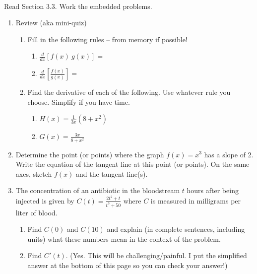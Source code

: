 \documentclass[11pt,fleqn]{article}
\begin{document}
\renewcommand{\headrulewidth}{0pt}
\newcommand{\blank}[1]{\rule{#1}{0.75pt}}
\newcommand{\bc}{\begin{center}}
\newcommand{\ec}{\end{center}}
\renewcommand{\d}{\displaystyle}

\vspace*{-0.7in}

\begin{center}
  \large
  \\
\end{center}
Read Section 3.3. Work the embedded problems. \\
\begin{enumerate}
\item Review (aka mini-quiz)\\
	\begin{enumerate}
	\item Fill in the following rules -- from memory if possible!\\
	\begin{multicols}{2}
	\begin{enumerate}
	\item $\displaystyle{\frac{d}{dx}\left[f(x)\: g(x)\right]=}$\\

	\item $\displaystyle{\frac{d}{dx}\left[\frac{f(x)}{g(x)}\right]=}$\\

	\end{enumerate}
	\end{multicols}
	
	\item Find the derivative of each of the following. Use whatever rule you choose. Simplify if you have time.
	\begin{enumerate}
	\item $H(x)=\frac{1}{3x}(8+x^2)$
	\vfill
	\item $G(x)=\frac{3x}{8+ x^2}$
	\vfill
	\end{enumerate}
	\end{enumerate}
\item Determine the point (or points) where the graph $f(x)=x^3$ has a slope of 2. Write the equation of the tangent line at this point (or points). On the same axes, sketch $f(x)$ and the tangent line(s).
\vfill

\newpage
\item The concentration of an antibiotic in the bloodstream $t$ hours after being injected is given by $\displaystyle{C(t)=\frac{2t^2+t}{t^3+50}}$ where $C$ is measured in milligrams per liter of blood.	
	\begin{enumerate} 
	\item Find $C(0)$ and $C(10)$ and explain (in complete sentences,  including units) what these numbers mean in the context of the problem. \\
	\vfill
	\item Find $C'(t)$. (Yes. This will be challenging/painful. I put the simplified answer at the bottom of this page so you can check your answer!)
	\vfill
	

\end{enumerate}
\end{enumerate}
\end{document}
